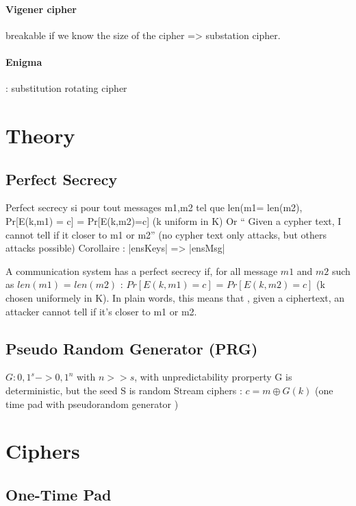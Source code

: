 \subsubsection{Vigener cipher }
breakable if we know the size of the
cipher => substation cipher.\\

\subsubsection{Enigma }
: substitution rotating cipher\\



\chapter{Theory}

\section{Perfect Secrecy}
Perfect secrecy si pour tout messages m1,m2 tel que len(m1= len(m2), 
Pr[E(k,m1) = c] = Pr[E(k,m2)=c] (k uniform in K)
Or “ Given a cypher text, I cannot tell if it closer to m1 or m2”  (no cypher text only attacks, but others attacks possible)
Corollaire : |ensKeys| => |ensMsg|

A communication system has a perfect secrecy if, for all message $m1$ and $m2$ such as $len(m1)$ = $len(m2)$ :  $ Pr[E(k,m1) = c]$ = $Pr[E(k,m2)=c]$ (k chosen uniformely in K).
In plain words, this means that , given a ciphertext,  an attacker cannot tell if it's closer to m1 or m2.

\section{Pseudo Random Generator (PRG)} 
$ G : {0,1}^s -> {0,1}^n $  with  $n>>s$, with unpredictability prorperty
G is deterministic, but the seed S is random
Stream ciphers : $c = m \oplus G(k) $  (one time pad with pseudorandom generator )


\chapter{Ciphers}


\section{One-Time Pad}

